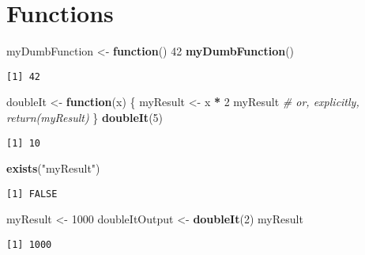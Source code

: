 \documentclass[12pt,letterpaperpaper,openany]{book}
\newenvironment{Shaded}{\begin{snugshade}}{\end{snugshade}}
\newcommand{\CommentTok}[1]{\textcolor[rgb]{0.56,0.35,0.01}{\textit{#1}}}
\newcommand{\ControlFlowTok}[1]{\textcolor[rgb]{0.13,0.29,0.53}{\textbf{#1}}}
\newcommand{\DecValTok}[1]{\textcolor[rgb]{0.00,0.00,0.81}{#1}}
\newcommand{\KeywordTok}[1]{\textcolor[rgb]{0.13,0.29,0.53}{\textbf{#1}}}
\newcommand{\NormalTok}[1]{#1}
\newcommand{\OperatorTok}[1]{\textcolor[rgb]{0.81,0.36,0.00}{\textbf{#1}}}
\newcommand{\StringTok}[1]{\textcolor[rgb]{0.31,0.60,0.02}{#1}}
\begin{document}
\hypertarget{functions}{%
\chapter{Functions}\label{functions}}

\begin{Shaded}
\begin{Highlighting}[]
\NormalTok{myDumbFunction <-}\StringTok{ }\ControlFlowTok{function}\NormalTok{() }\DecValTok{42}
\KeywordTok{myDumbFunction}\NormalTok{()}
\end{Highlighting}
\end{Shaded}

\begin{verbatim}
[1] 42
\end{verbatim}

\begin{Shaded}
\begin{Highlighting}[]
\NormalTok{doubleIt <-}\StringTok{ }\ControlFlowTok{function}\NormalTok{(x) \{}
\NormalTok{  myResult <-}\StringTok{ }\NormalTok{x }\OperatorTok{*}\StringTok{ }\DecValTok{2}
\NormalTok{  myResult }\CommentTok{# or, explicitly, return(myResult)}
\NormalTok{\}}
\KeywordTok{doubleIt}\NormalTok{(}\DecValTok{5}\NormalTok{)}
\end{Highlighting}
\end{Shaded}

\begin{verbatim}
[1] 10
\end{verbatim}

\begin{Shaded}
\begin{Highlighting}[]
\KeywordTok{exists}\NormalTok{(}\StringTok{"myResult"}\NormalTok{)}
\end{Highlighting}
\end{Shaded}

\begin{verbatim}
[1] FALSE
\end{verbatim}

\begin{Shaded}
\begin{Highlighting}[]
\NormalTok{myResult <-}\StringTok{ }\DecValTok{1000}
\NormalTok{doubleItOutput <-}\StringTok{ }\KeywordTok{doubleIt}\NormalTok{(}\DecValTok{2}\NormalTok{)}
\NormalTok{myResult}
\end{Highlighting}
\end{Shaded}

\begin{verbatim}
[1] 1000
\end{verbatim}
\end{document}

